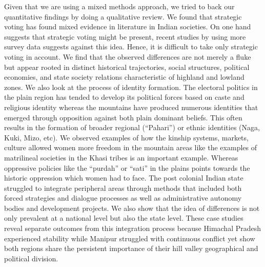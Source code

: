 Given that we are using a mixed methods approach, we tried to back our quantitative findings by doing a qualitative review. We found that strategic voting has found mixed evidence in literature in Indian societies. On one hand \cite{choi2009strategic} suggests that strategic voting might be present, recent studies by \cite{ziegfeld2021accounts} using more survey data  suggests against this idea. Hence, it is difficult to take only strategic voting in account. We find that the observed differences are not merely a fluke but appear rooted in distinct historical trajectories, social structures, political economies, and state society relations characteristic of highland and lowland zones.  We also look at the process of identity formation. The electoral politics in the plain region has tended to develop its political forces based on caste and religious identity whereas the mountains have produced numerous identities that emerged through opposition against both plain dominant beliefs. This often results in the formation of broader regional (``Pahari'') or ethnic identities (Naga, Kuki, Mizo, etc). We observed examples of how the kinship systems, markets, culture allowed women more freedom in the mountain areas like the examples of matrilineal societies in the Khasi tribes is an important example. Whereas oppressive policies like the ``purdah'' or ``sati'' in the plains points towards the historic oppression which women had to face.  The post colonial Indian state struggled to integrate peripheral areas through methods that included both forced strategies and dialogue processes as well as administrative autonomy bodies and development projects. We also show that the idea of differences is not only prevalent at a national level but also the state level. These case studies reveal separate outcomes from this integration process because Himachal Pradesh experienced stability while Manipur struggled with continuous conflict yet show both regions share the persistent importance of their hill valley geographical and political division.


